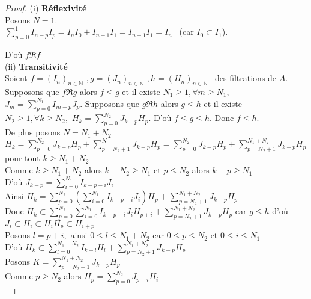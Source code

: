 \begin{proof}
	(i) \textbf{Réflexivité} \\
	Posons $N=1$. \\
	$\displaystyle \sum_{p=0}^{1}I_{n-p}I_{p}=I_{n}I_{0}+I_{n-1}I_{1}=I_{n-1}I_{1}=I_{n}$ \
	(car $I_{0}\subset I_{1}$).
	
	D'où $f \Re f$ \\
	(ii) \textbf{Transitivité} \\
	Soient $f=(I_{n})_{n\in \mathbb{N}}$ $,g=(J_{n})_{n\in \mathbb{N}}$ $,h=(H_{n})_{n\in \mathbb{N}}$ \ des filtrations de $A.$ \\
	Supposons que $f \Re g$
	alors $f\leq g$ et il existe $N_{1}\geq 1,\forall m\geq N_{1},$ $J_{m}=\displaystyle  \sum_{p=0}^{N_{1}}I_{m-p}J_{p}$.
	Supposons que $g \Re h$ alors $g\leq h$ et il existe $N_{2}\geq 1,\forall k\geq N_{2},$ $H_{k}=\displaystyle  \sum_{p=0}^{N_{2}}J_{k-p}H_{p}$.
	D'où $f\leq g\leq h.$ Donc $f\leq h$. \\
	De plus posons $N=N_{1}+N_{2}$ \\
	$H_{k}=\displaystyle  \sum_{p=0}^{N_{2}}J_{k-p}H_{p}+\displaystyle  \sum_{p=N_{2}+1}^{N}J_{k-p}H_{p}=\displaystyle  \sum_{p=0}^{N_{2}}J_{k-p}H_{p}+\displaystyle  \sum_{p=N_{2}+1}^{N_{1}+N_{2}}J_{k-p}H_{p}$ pour tout $k\geq N_{1}+N_{2}$ \\
	Comme $k\geq N_{1}+N_{2}$ alors $k-N_{2}\geq N_{1}$ et $p\leq N_{2}$ alors $k-p\geq N_{1}$ \\
	D'où $J_{k-p}=\displaystyle  \sum_{i=0}^{N_{1}}I_{k-p-i}J_{i}$ \\
	Ainsi $H_{k}=\displaystyle  \sum_{p=0}^{N_{2}}(\displaystyle  \sum_{i=0}^{N_{1}}I_{k-p-i}J_{i})H_{p}+\displaystyle  \sum_{p=N_{2}+1}^{N_{1}+N_{2}}J_{k-p}H_{p}$ \\
	Donc $H_{k}\subset \displaystyle  \sum_{p=0}^{N_{2}}\displaystyle  \sum_{i=0}^{N_{1}}I_{k-p-i}J_{i}H_{p+i}+\displaystyle  \sum_{p=N_{2}+1}^{N_{1}+N_{2}}J_{k-p}H_{p}$  car $g\leq h$ d'où $ J_{i}\subset H_{i}\subset H_{i}H_{p}\subset H_{i+p}$ \\
	Posons $l=p+i,$ ainsi $0\leq l\leq N_{1}+N_{2}$ car $0\leq p\leq N_{2}$ et $ 0\leq i\leq N_{1}$ \\
	D'où $H_{k}\subset \displaystyle  \sum_{l=0}^{N_{1}+N_{2}}I_{k-l}H_{l}+\displaystyle  \sum_{p=N_{2}+1}^{N_{1}+N_{2}}J_{k-p}H_{p}$ \\
	Posons $K=\displaystyle  \sum_{p=N_{2}+1}^{N_{1}+N_{2}}J_{k-p}H_{p}$ \\
	Comme $p\geq N_{2}$ alors $H_{p}=\displaystyle  \sum_{p=0}^{N_{2}}J_{p-i}H_{i}$ \\

\end{proof}
